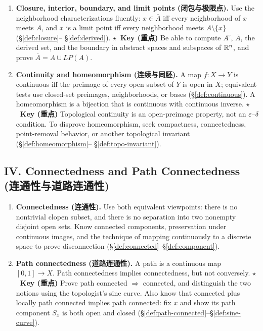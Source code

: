 \documentclass{article}
\newcommand{\reviewkey}{\textcolor{red!65!black}{\textbf{\ensuremath{\star}\ Key (重点)}}}
\begin{document}
\begin{enumerate}
  \item \textbf{Closure, interior, boundary, and limit points (闭包与极限点).}
  Use the neighborhood characterizations fluently: $x\in\overline{A}$ iff
  every neighborhood of $x$ meets $A$, and $x$ is a limit point iff every
  neighborhood meets $A\setminus\{x\}$ (\S\ref{def:closure}--
  \S\ref{def:derived}). \reviewkey{} Be able to compute $A^\circ$,
  $\overline A$, the derived set, and the boundary in abstract spaces and
  subspaces of $\mathbb{R}^n$, and prove $\overline A=A\cup LP(A)$.

  \item \textbf{Continuity and homeomorphism (连续与同胚).} A map $f:X\to Y$
  is continuous iff the preimage of every open subset of $Y$ is open in $X$;
  equivalent tests use closed-set preimages, neighborhoods, or bases
  (\S\ref{def:continuous}). A homeomorphism is a bijection that is continuous
  with continuous inverse. \reviewkey{} Topological continuity is an
  open-preimage property, not an $\varepsilon$--$\delta$ condition. To disprove
  homeomorphism, seek compactness, connectedness, point-removal behavior, or
  another topological invariant (\S\ref{def:homeomorphism}--
  \S\ref{def:topo-invariant}).
\end{enumerate}

\subsection*{IV. Connectedness and Path Connectedness (连通性与道路连通性)}

\begin{enumerate}
  \item \textbf{Connectedness (连通性).} Use both equivalent viewpoints:
  there is no nontrivial clopen subset, and there is no separation into two
  nonempty disjoint open sets. Know connected components, preservation under
  continuous images, and the technique of mapping continuously to a discrete
  space to prove disconnection (\S\ref{def:connected}--\S\ref{def:component}).

  \item \textbf{Path connectedness (道路连通性).} A path is a continuous map
  $[0,1]\to X$. Path connectedness implies connectedness, but not conversely.
  \reviewkey{} Prove path connected $\Rightarrow$ connected, and distinguish
  the two notions using the topologist's sine curve. Also know that connected
  plus locally path connected implies path connected: fix $x$ and show its
  path component $S_x$ is both open and closed
  (\S\ref{def:path-connected}--\S\ref{def:sine-curve}).
\end{enumerate}
\end{document}
